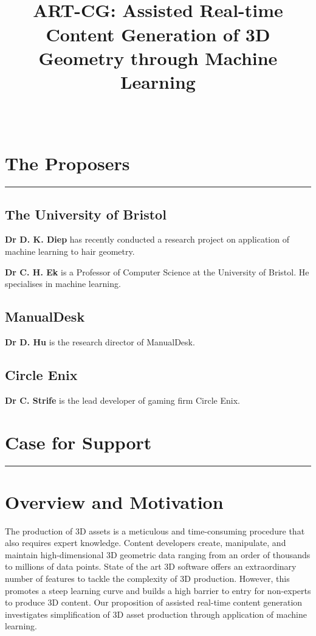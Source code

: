 \documentclass[a4paper, fontsize=15pt, onecolumn]{article} %
\title{
	\vspace{-3.0cm}
	\horrule{0.4pt} \\[0.2cm] %
	\vspace{0.2cm}
	\Large ART-CG: Assisted Real-time Content Generation of 3D Geometry through Machine Learning\\
	\horrule{0.4pt} \\[0cm] %
	\vspace{-0.5cm}
}
\date{} %
\numberwithin{equation}{section} %
\numberwithin{figure}{section} %
\numberwithin{table}{section} %
\begin{document}
\maketitle
\thispagestyle{fancy} %

\section*{The Proposers}
\hrule
\subsection*{The University of Bristol}
\textbf{Dr D. K. Diep} has recently conducted a research project on application of machine learning to hair geometry.

\textbf{Dr C. H. Ek} is a Professor of Computer Science at the University of Bristol. He specialises in machine learning.

\subsection*{ManualDesk}
\textbf{Dr D. Hu} is the research director of ManualDesk.

\subsection*{Circle Enix}
\textbf{Dr C. Strife} is the lead developer of gaming firm Circle Enix.

\newpage

\section*{Case for Support}
\hrule
\section{Overview and Motivation}
\label{motivation}
The production of 3D assets is a meticulous and time-consuming procedure that also requires expert knowledge. Content developers create, manipulate, and maintain high-dimensional 3D geometric data ranging from an order of thousands to millions of data points. State of the art 3D software offers an extraordinary number of features to tackle the complexity of 3D production. However, this promotes a steep learning curve and builds a high barrier to entry for non-experts to produce 3D content. Our proposition of assisted real-time content generation investigates simplification of 3D asset production through application of machine learning.
\end{document}
